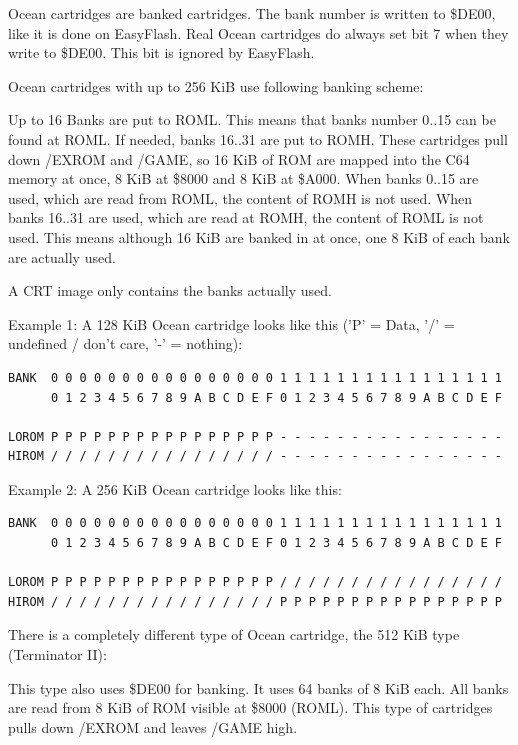 \documentclass[a4paper,oneside]{memoir}
\begin{document}
Ocean cartridges are banked cartridges. The bank number is written to \$DE00,
like it is done on EasyFlash.
Real Ocean cartridges do always set bit 7 when they write to \$DE00. This bit
is ignored by EasyFlash.

Ocean cartridges with up to 256 KiB use following banking scheme:

Up to 16 Banks are put to ROML. This means that banks number 0..15 can be found
at ROML. If needed, banks 16..31 are put to ROMH. These cartridges pull down
/EXROM and /GAME, so 16 KiB of ROM are mapped into the C64 memory at once, 8
KiB at \$8000 and 8 KiB at \$A000.
When banks 0..15 are used, which are read from ROML, the content of ROMH is not
used. When banks 16..31 are used, which are read at ROMH, the content of ROML
is not used. This means although 16 KiB are banked in at once, one 8 KiB of
each bank are actually used.

A CRT image only contains the banks actually used.

Example 1: A 128 KiB Ocean cartridge looks like this ('P' = Data, '/' =
undefined / don't care, '-' = nothing):

\small
\begin{verbatim}
BANK  0 0 0 0 0 0 0 0 0 0 0 0 0 0 0 0 1 1 1 1 1 1 1 1 1 1 1 1 1 1 1 1
      0 1 2 3 4 5 6 7 8 9 A B C D E F 0 1 2 3 4 5 6 7 8 9 A B C D E F

LOROM P P P P P P P P P P P P P P P P - - - - - - - - - - - - - - - -
HIROM / / / / / / / / / / / / / / / / - - - - - - - - - - - - - - - -
\end{verbatim}
\normalsize

Example 2: A 256 KiB Ocean cartridge looks like this:

\small
\begin{verbatim}
BANK  0 0 0 0 0 0 0 0 0 0 0 0 0 0 0 0 1 1 1 1 1 1 1 1 1 1 1 1 1 1 1 1
      0 1 2 3 4 5 6 7 8 9 A B C D E F 0 1 2 3 4 5 6 7 8 9 A B C D E F

LOROM P P P P P P P P P P P P P P P P / / / / / / / / / / / / / / / /
HIROM / / / / / / / / / / / / / / / / P P P P P P P P P P P P P P P P
\end{verbatim}
\normalsize

There is a completely different type of Ocean cartridge, the 512 KiB type
(Terminator II):

This type also uses \$DE00 for banking. It uses 64 banks of 8 KiB each. All
banks are read from 8 KiB of ROM visible at \$8000 (ROML). This type of
cartridges pulls down /EXROM and leaves /GAME high.
\end{document}
